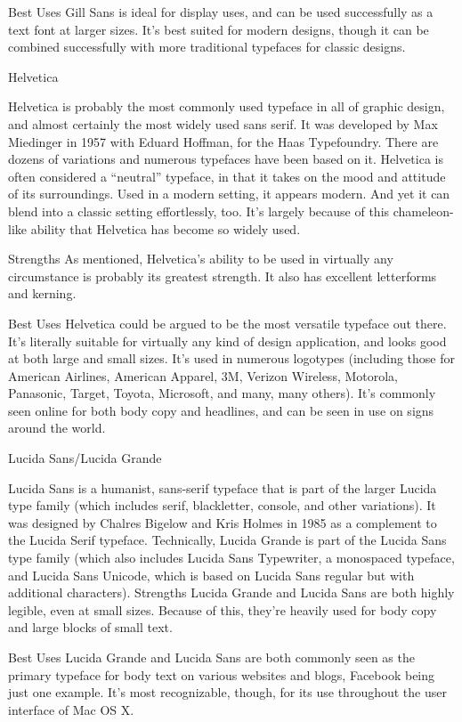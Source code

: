 \documentclass[12pt,a4paper,twocolumn]{book} %
\begin{document}
Best Uses
Gill Sans is ideal for display uses, and can be used successfully as a text font at larger sizes. It’s best suited for modern designs, though it can be combined successfully with more traditional typefaces for classic designs.


Helvetica

Helvetica is probably the most commonly used typeface in all of graphic design, and almost certainly the most widely used sans serif. It was developed by Max Miedinger in 1957 with Eduard Hoffman, for the Haas Typefoundry. There are dozens of variations and numerous typefaces have been based on it.
Helvetica is often considered a “neutral” typeface, in that it takes on the mood and attitude of its surroundings. Used in a modern setting, it appears modern. And yet it can blend into a classic setting effortlessly, too. It’s largely because of this chameleon-like ability that Helvetica has become so widely used.

Strengths
As mentioned, Helvetica’s ability to be used in virtually any circumstance is probably its greatest strength. It also has excellent letterforms and kerning.

Best Uses
Helvetica could be argued to be the most versatile typeface out there. It’s literally suitable for virtually any kind of design application, and looks good at both large and small sizes. It’s used in numerous logotypes (including those for American Airlines, American Apparel, 3M, Verizon Wireless, Motorola, Panasonic, Target, Toyota, Microsoft, and many, many others). It’s commonly seen online for both body copy and headlines, and can be seen in use on signs around the world.


Lucida Sans/Lucida Grande

Lucida Sans is a humanist, sans-serif typeface that is part of the larger Lucida type family (which includes serif, blackletter, console, and other variations). It was designed by Chalres Bigelow and Kris Holmes in 1985 as a complement to the Lucida Serif typeface. Technically, Lucida Grande is part of the Lucida Sans type family (which also includes Lucida Sans Typewriter, a monospaced typeface, and Lucida Sans Unicode, which is based on Lucida Sans regular but with additional characters).
Strengths
Lucida Grande and Lucida Sans are both highly legible, even at small sizes. Because of this, they’re heavily used for body copy and large blocks of small text.

Best Uses
Lucida Grande and Lucida Sans are both commonly seen as the primary typeface for body text on various websites and blogs, Facebook being just one example. It’s most recognizable, though, for its use throughout the user interface of Mac OS X.
\end{document}
